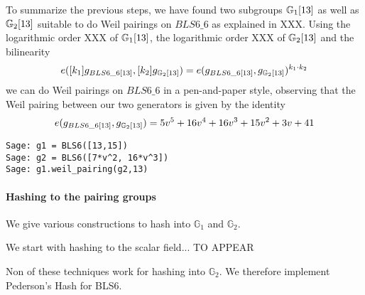 To summarize the previous steps, we have found two subgroups $\mathbb{G}_1[13]$ as well as $\mathbb{G}_2[13]$ suitable to do Weil pairings on $BLS6\_6$ as explained in XXX. Using the logarithmic order XXX of $\mathbb{G}_1[13]$, the logarithmic order XXX of $\mathbb{G}_2[13]$ and the bilinearity 
$$
e([k_1]g_{BLS6\_6[13]},[k_2]g_{\mathbb{G}_2[13]}) = 
e(g_{BLS6\_6[13]},g_{\mathbb{G}_2[13]})^{k_1\cdot k_2}
$$
we can do Weil pairings on $BLS6\_6$ in a pen-and-paper style, observing that the Weil pairing between our two generators is given by the identity
$$
e(g_{BLS6\_6[13]},g_{\mathbb{G}_2[13]})= 5v^5 + 16v^4 + 16v^3 + 15v^2 + 3v + 41
$$
\begin{verbatim}
Sage: g1 = BLS6([13,15])
Sage: g2 = BLS6([7*v^2, 16*v^3])
Sage: g1.weil_pairing(g2,13)
\end{verbatim}
\paragraph{Hashing to the pairing groups}
We give various constructions to hash into $\mathbb{G}_1$ and $\mathbb{G}_2$. 

We start with hashing to the scalar field... TO APPEAR

Non of these techniques work for hashing into $\mathbb{G}_2$. We therefore implement Pederson's Hash for BLS6. 

